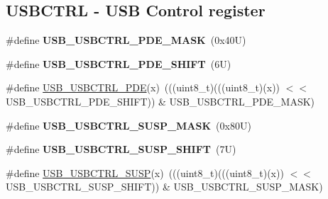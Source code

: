 \subsection*{U\+S\+B\+C\+T\+RL -\/ U\+SB Control register}
\begin{DoxyCompactItemize}
\item 
\mbox{\label{group___u_s_b___register___masks_ga7fb8345a32022ec5df5129278d1aed30}} 
\#define {\bfseries U\+S\+B\+\_\+\+U\+S\+B\+C\+T\+R\+L\+\_\+\+P\+D\+E\+\_\+\+M\+A\+SK}~(0x40\+U)
\item 
\mbox{\label{group___u_s_b___register___masks_gaaf556df66acd4f6ff2bc1f4fad1a05ed}} 
\#define {\bfseries U\+S\+B\+\_\+\+U\+S\+B\+C\+T\+R\+L\+\_\+\+P\+D\+E\+\_\+\+S\+H\+I\+FT}~(6\+U)
\item 
\#define \mbox{\hyperlink{group___u_s_b___register___masks_ga6a35a726a9f00f3e8762aa76a95e4682}{U\+S\+B\+\_\+\+U\+S\+B\+C\+T\+R\+L\+\_\+\+P\+DE}}(x)~(((uint8\+\_\+t)(((uint8\+\_\+t)(x)) $<$$<$ U\+S\+B\+\_\+\+U\+S\+B\+C\+T\+R\+L\+\_\+\+P\+D\+E\+\_\+\+S\+H\+I\+FT)) \& U\+S\+B\+\_\+\+U\+S\+B\+C\+T\+R\+L\+\_\+\+P\+D\+E\+\_\+\+M\+A\+SK)
\item 
\mbox{\label{group___u_s_b___register___masks_gac65859ca12bfe997afc67545c8b1a052}} 
\#define {\bfseries U\+S\+B\+\_\+\+U\+S\+B\+C\+T\+R\+L\+\_\+\+S\+U\+S\+P\+\_\+\+M\+A\+SK}~(0x80\+U)
\item 
\mbox{\label{group___u_s_b___register___masks_ga44772d68648a57e6341ceec7fd5268f3}} 
\#define {\bfseries U\+S\+B\+\_\+\+U\+S\+B\+C\+T\+R\+L\+\_\+\+S\+U\+S\+P\+\_\+\+S\+H\+I\+FT}~(7\+U)
\item 
\#define \mbox{\hyperlink{group___u_s_b___register___masks_gacf465e2b204f5bb95e476574c35dd74a}{U\+S\+B\+\_\+\+U\+S\+B\+C\+T\+R\+L\+\_\+\+S\+U\+SP}}(x)~(((uint8\+\_\+t)(((uint8\+\_\+t)(x)) $<$$<$ U\+S\+B\+\_\+\+U\+S\+B\+C\+T\+R\+L\+\_\+\+S\+U\+S\+P\+\_\+\+S\+H\+I\+FT)) \& U\+S\+B\+\_\+\+U\+S\+B\+C\+T\+R\+L\+\_\+\+S\+U\+S\+P\+\_\+\+M\+A\+SK)
\end{DoxyCompactItemize}
